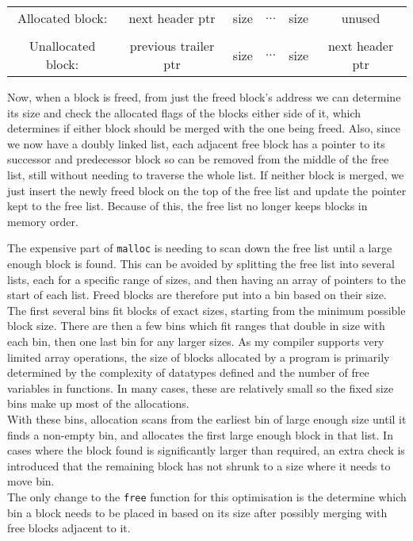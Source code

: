   \begin{tabular}{c|c|c|c|c|c|} \cline{2-6}
Allocated block: &   next header ptr  & size & $\dots$ & size & unused \\ \cline{2-6} \multicolumn{1}{c}{}  \\ \cline{2-6}
Unallocated block: &  previous trailer ptr & size & $\dots$ & size & next header ptr \\ \cline{2-6}
\end{tabular}

Now, when a block is freed, from just the freed block's address we can determine its size and check the allocated flags of the blocks either side of it, which determines if either block should be merged with the one being freed. Also, since we now have a doubly linked list, each adjacent free block has a pointer to its successor and predecessor block so can be removed from the middle of the free list, still without needing to traverse the whole list. If neither block is merged, we just insert the newly freed block on the top of the free list and update the pointer kept to the free list. Because of this, the free list no longer keeps blocks in memory order.


The expensive part of \verb|malloc| is needing to scan down the free list until a large enough block is found. 
This can be avoided by splitting the free list into several lists, each for a specific range of sizes, and then having an array of pointers to the start of each list. 
Freed blocks are therefore put into a bin based on their size. The first several bins fit blocks of exact sizes, starting from the minimum possible block size. There are then a few bins which fit ranges that double in size with each bin, then one last bin for any larger sizes. 
As my compiler supports very limited array operations, the size of blocks allocated by a program is primarily determined by the complexity of datatypes defined and the number of free variables in functions. In many cases, these are relatively small so the fixed size bins make up most of the allocations. \\
With these bins, allocation scans from the earliest bin of large enough size until it finds a non-empty bin, and allocates the first large enough block in that list. In cases where the block found is significantly larger than required, an extra check is introduced that the remaining block has not shrunk to a size where it needs to move bin. \\
The only change to the \verb|free| function for this optimisation is the determine which bin a block needs to be placed in based on its size after possibly merging with free blocks adjacent to it.












